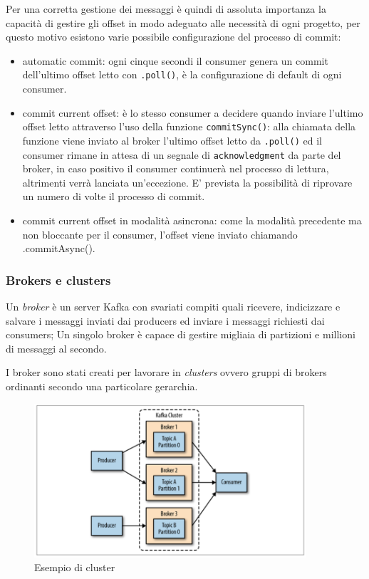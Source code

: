 \documentclass[]{article}
\providecommand{\tightlist}{%
  \setlength{\itemsep}{0pt}\setlength{\parskip}{0pt}}
\begin{document}
Per una corretta gestione dei messaggi è quindi di assoluta importanza
la capacità di gestire gli offset in modo adeguato alle necessità di
ogni progetto, per questo motivo esistono varie possibile configurazione
del processo di commit:

\begin{itemize}
\tightlist
\item
  automatic commit: ogni cinque secondi il consumer genera un commit
  dell'ultimo offset letto con \texttt{.poll()}, è la configurazione di
  default di ogni consumer.
\item
  commit current offset: è lo stesso consumer a decidere quando inviare
  l'ultimo offset letto attraverso l'uso della funzione
  \texttt{commitSync()}: alla chiamata della funzione viene inviato al
  broker l'ultimo offset letto da \texttt{.poll()} ed il consumer rimane
  in attesa di un segnale di \texttt{acknowledgment} da parte del
  broker, in caso positivo il consumer continuerà nel processo di
  lettura, altrimenti verrà lanciata un'eccezione. E' prevista la
  possibilità di riprovare un numero di volte il processo di commit.
\item
  commit current offset in modalità asincrona: come la modalità
  precedente ma non bloccante per il consumer, l'offset viene inviato
  chiamando .commitAsync().
\end{itemize}

\subsubsection{Brokers e clusters}\label{brokers-e-clusters}

Un \emph{broker} è un server Kafka con svariati compiti quali ricevere,
indicizzare e salvare i messaggi inviati dai producers ed inviare i
messaggi richiesti dai consumers; Un singolo broker è capace di gestire
migliaia di partizioni e millioni di messaggi al secondo.

I broker sono stati creati per lavorare in \emph{clusters} ovvero gruppi
di brokers ordinanti secondo una particolare gerarchia.

\begin{figure}
\centering
\includegraphics[width=0.90000\textwidth]{../images/kafka-cluster.png}
\caption{Esempio di cluster \label{figure_5}}
\end{figure}
\end{document}
